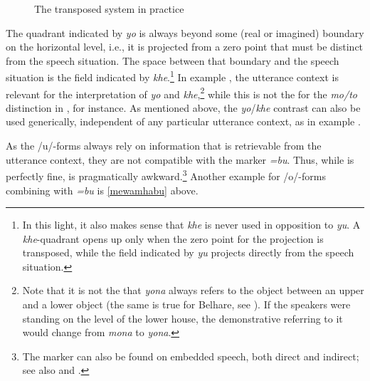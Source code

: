 \begin{figure}
\centering
\setlength{\fboxsep}{0pt}
\caption{The transposed system in practice}\label{deixill-3}
\end{figure}

The quadrant indicated by \emph{yo} is always beyond some (real or imagined) boundary on the horizontal level, i.e., it is projected from a zero point that must be distinct from the speech situation. The space between that boundary and the speech situation is the field indicated by \emph{khe}.\footnote{In this light, it also makes sense that \emph{khe} is never used in opposition to \emph{yu}. A \emph{khe}-quadrant opens up only when the zero point for the projection is transposed, while the field indicated by \emph{yu} projects directly from the speech situation.} In  example \Last[a], the  utterance context is relevant for the interpretation of \emph{yo} and \emph{khe},\footnote{Note that it is not the  that \emph{yona} always refers to the object between an upper and a lower object (the same is true for Belhare, see \citealt{Bickel2001Deictic}).  If the speakers were standing on the level of the lower house, the demonstrative referring to it would change from \emph{mona} to \emph{yona}.} while this is not the  for the \emph{mo/to} distinction in \LLast[b], for instance. As mentioned above, the \emph{yo}/\emph{khe}  contrast can also be used generically, independent  of any particular utterance context, as in example  \Last[b].
 
As the /u/-forms always rely on information that is retrievable from the utterance context, they are not compatible with the  marker \emph{=bu}. Thus, while \Next[a] is perfectly fine, \Next[b] is pragmatically awkward.\footnote{The  marker can also be found on embedded speech, both direct and indirect; see also  and .} Another example for /o/-forms combining with \emph{=bu} is \ref{mewamhabu} above.

